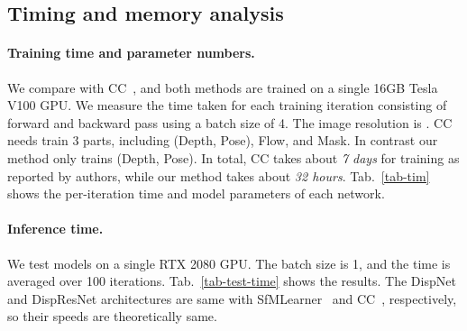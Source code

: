 \documentclass{article}
\newcommand{\tabref}[1]{Tab.~\ref{#1}}
\begin{document}
\subsection{Timing and memory analysis}


\paragraph{Training time and parameter numbers.}
We compare with CC~\cite{ranjan2019cc}, and both methods are trained on a single 16GB Tesla V100 GPU.
We measure the time taken for each training iteration consisting of forward and backward pass using a batch size of 4.
The image resolution is .
CC~\cite{ranjan2019cc} needs train 3 parts, including (Depth, Pose), Flow, and Mask.
In contrast our method only trains (Depth, Pose).
In total, CC takes about \emph{7 days} for training as reported by authors, while our method takes about \emph{32 hours}.
\tabref{tab-tim} shows the per-iteration time and model parameters of each network.

\begin{table}[ht]
    \centering
    \caption{Training time per iteration and model parameters for each network.}
    \label{tab-tim}
\end{table}


\paragraph{Inference time.}
We test models on a single RTX 2080 GPU.
The batch size is 1, and the time is averaged over 100 iterations.
\tabref{tab-test-time} shows the results.
The DispNet and DispResNet architectures are same with SfMLearner~\cite{zhou2017unsupervised} and CC~\cite{ranjan2019cc}, respectively,
so their speeds are theoretically same.

\begin{table}[!ht]
    \centering
    \caption{Inference time on per image or image pair.}
    \label{tab-test-time}
     \vspace{-2mm}
\end{table}
\end{document}
